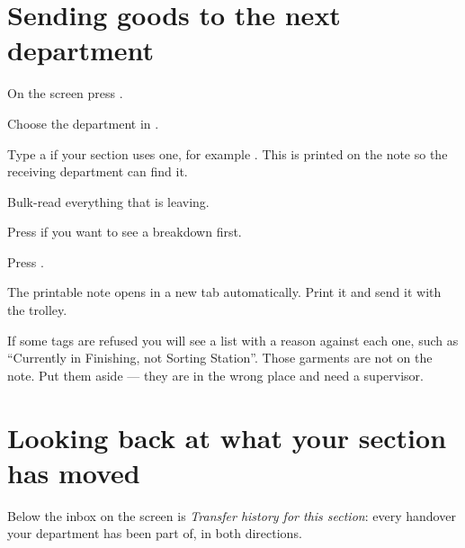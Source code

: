 \section{Sending goods to the next department}
\label{sec:dispatch}

\begin{steps}
  \item On the  screen press .
  \item Choose the department in .
  \item Type a  if your section uses one, for example
        . This is printed on the note so the receiving
        department can find it.
  \item Bulk-read everything that is leaving.
  \item Press  if you want to see a breakdown first.
  \item Press .
\end{steps}


The printable note opens in a new tab automatically. Print it and send it with
the trolley.

\begin{warnbox}
If some tags are refused you will see a list with a reason against each one, such
as ``Currently in Finishing, not Sorting Station''. Those garments are not on the
note. Put them aside --- they are in the wrong place and need a supervisor.
\end{warnbox}

\section{Looking back at what your section has moved}

Below the inbox on the  screen is \emph{Transfer history for this
section}: every handover your department has been part of, in both directions.


